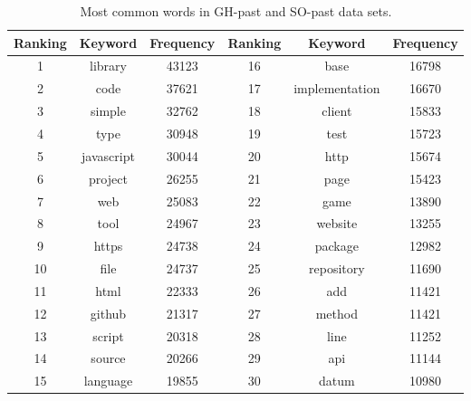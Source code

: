        \begin{table}
          \centering
          \caption{Most common words in GH-past and SO-past data sets.}\label{tab:RQ3_past}
            \vspace{6pt} %
          \begin{tabular}{|c c c | c c c|}
            \hline
            Ranking & Keyword & Frequency & Ranking & Keyword & Frequency \\
            \hline\hline
            1 & library & 43123 & 16 & base & 16798 \\
            2 & code & 37621 & 17 & implementation & 16670 \\
            3 & simple & 32762 & 18 & client & 15833 \\
            4 & type & 30948 & 19 & test & 15723 \\
            5 & javascript & 30044 & 20 & http & 15674 \\
            6 & project & 26255 & 21 & page & 15423 \\
            7 & web & 25083 & 22 & game & 13890 \\
            8 & tool & 24967 & 23 & website & 13255 \\
            9 & https & 24738 & 24 & package & 12982 \\
            10 & file & 24737 & 25 & repository & 11690 \\
            11 & html & 22333 & 26 & add & 11421 \\
            12 & github & 21317 & 27 & method & 11421 \\
            13 & script & 20318 & 28 & line & 11252 \\
            14 & source & 20266 & 29 & api & 11144 \\
            15 & language & 19855 & 30 & datum & 10980 \\
            \hline
          \end{tabular}
        \end{table}
        
